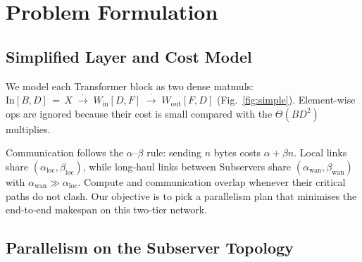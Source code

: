 \documentclass{article}
\begin{document}



\section{Problem Formulation}

\subsection{Simplified Layer and Cost Model}

We model each Transformer block as two dense matmuls:
$\text{In}[B,D]\,{=}\,X\;
\stackrel{\cdot}{\rightarrow}\;
W_{\text{in}}[D,F]\;
\stackrel{\cdot}{\rightarrow}\;
W_{\text{out}}[F,D]$
(Fig.~\ref{fig:simple}).  Element‑wise ops are ignored because their cost is small compared with the $\Theta(BD^{2})$ multiplies.

Communication follows the $\alpha$–$\beta$ rule: sending $n$ bytes costs
$\alpha + \beta n$.  
Local links share $(\alpha_{\text{loc}},\beta_{\text{loc}})$,
while long‑haul links between Subservers share
$(\alpha_{\text{wan}},\beta_{\text{wan}})$ with
$\alpha_{\text{wan}}\!\gg\!\alpha_{\text{loc}}$.
Compute and communication overlap whenever their critical paths do not clash.
Our objective is to pick a parallelism plan that minimises the end‑to‑end
makespan on this two‑tier network.



\subsection{Parallelism on the Subserver Topology}
\end{document}
